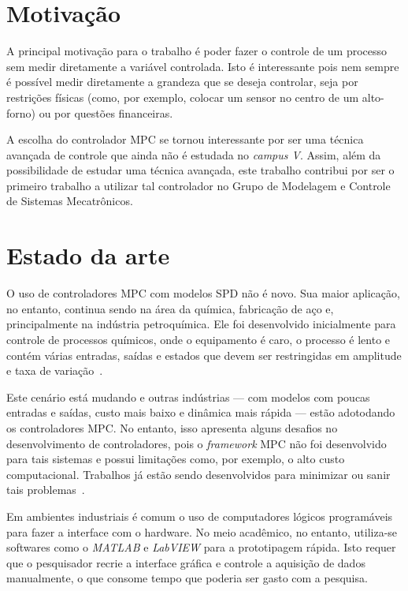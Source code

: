 \section{Motivação}%
\label{sec:motivacao}

A principal motivação para o trabalho é poder fazer o controle de um processo
sem medir diretamente a variável controlada. Isto é interessante pois nem sempre
é possível medir diretamente a grandeza que se deseja controlar, seja por
restrições físicas (como, por exemplo, colocar um sensor no centro de um
alto-forno) ou por questões financeiras.

A escolha do controlador \ac{MPC} se tornou interessante por ser uma técnica
avançada de controle que ainda não é estudada no \textit{campus V}. Assim, além
da possibilidade de estudar uma técnica avançada, este trabalho contribui por
ser o primeiro trabalho a utilizar tal controlador no Grupo de Modelagem e
Controle de Sistemas Mecatrônicos.

\section{Estado da arte}%
\label{sec:estado-da-arte}

O uso de controladores \ac{MPC} com modelos \ac{SPD} não é novo. Sua maior
aplicação, no entanto, continua sendo na área da química, fabricação de aço e,
principalmente na indústria petroquímica. Ele foi desenvolvido inicialmente para
controle de processos químicos, onde o equipamento é caro, o processo é lento e
contém várias entradas, saídas e estados que devem ser restringidas em amplitude
e taxa de variação~\cite{article:cairano}.

Este cenário está mudando e outras indústrias --- com modelos com poucas
entradas e saídas, custo mais baixo e dinâmica mais rápida --- estão adotodando
os controladores \ac{MPC}\@. No entanto, isso apresenta alguns desafios no
desenvolvimento de controladores, pois o \textit{framework} \ac{MPC} não foi
desenvolvido para tais sistemas e possui limitações como, por exemplo, o alto
custo computacional. Trabalhos já estão sendo desenvolvidos para minimizar ou
sanir tais problemas~\cite{article:cairano}.

Em ambientes industriais é comum o uso de computadores lógicos programáveis para
fazer a interface com o hardware. No meio acadêmico, no entanto, utiliza-se
softwares como o \textit{MATLAB} e \textit{LabVIEW} para a prototipagem rápida.
Isto requer que o pesquisador recrie a interface gráfica e controle a aquisição
de dados manualmente, o que consome tempo que poderia ser gasto com a pesquisa.

